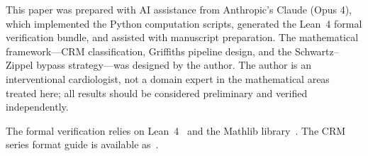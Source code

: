 \documentclass[11pt]{article}
\theoremstyle{plain}
\theoremstyle{definition}
\theoremstyle{remark}
\begin{document}
This paper was prepared with AI assistance from Anthropic's Claude (Opus 4),
which implemented the Python computation scripts, generated the Lean~4
formal verification bundle, and assisted with manuscript preparation.
The mathematical framework---CRM classification, Griffiths pipeline design,
and the Schwartz--Zippel bypass strategy---was designed by the author.
The author is an interventional cardiologist, not a domain expert in the mathematical areas treated here; all results should be considered preliminary and verified independently.

The formal verification relies on Lean~4~\cite{demoura2021} and the
Mathlib library~\cite{mathlib2020}.  The CRM series format guide is
available as~\cite{formatguide}.

\end{document}
